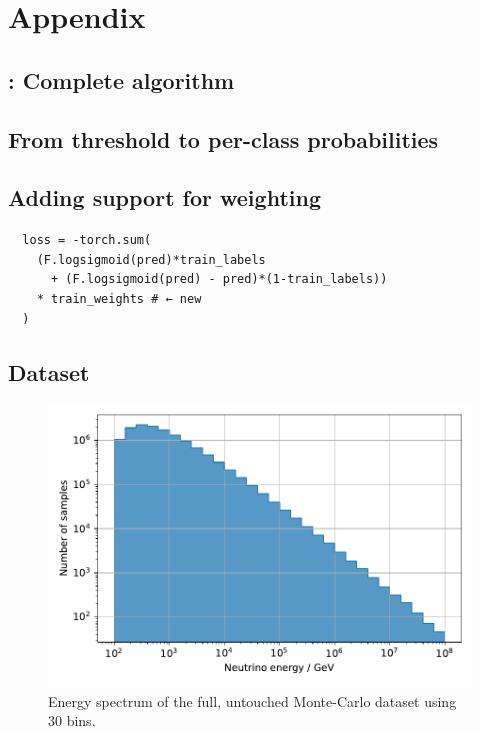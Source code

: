 \chapter{Appendix}
\blindtext

\section{\dseaplus: Complete algorithm} \label{sec:alg:dseaplus}



\section{From threshold to per-class probabilities}
\label{sec:appendix:corn_probas}
\blindtext


\section{Adding support for weighting}
\label{sec:appendix:corn_weighting}
\begin{verbatim}
  loss = -torch.sum(
    (F.logsigmoid(pred)*train_labels
      + (F.logsigmoid(pred) - pred)*(1-train_labels))
    * train_weights # ← new
  )
\end{verbatim}


\section{Dataset}
\begin{figure}
  \centering
  \includegraphics[scale=1]{content/plots/dataset:raw:histogram.pdf}
  \caption{Energy spectrum of the full, untouched Monte-Carlo dataset using 30 bins.}
  \label{fig:dataset:raw:histogram}
\end{figure}

